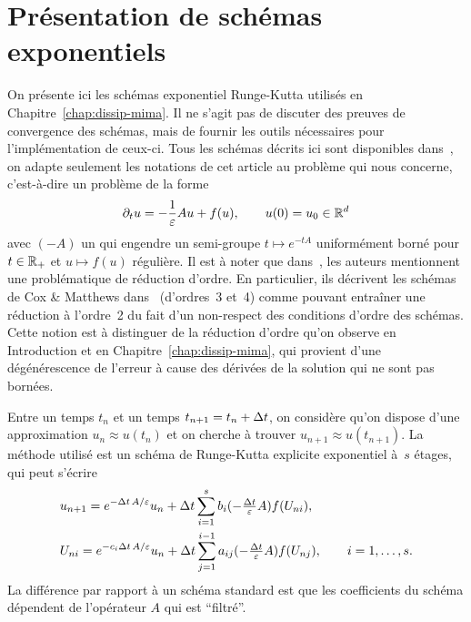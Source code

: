 
\chapter{Présentation de schémas exponentiels}
\label{chap:schemas}

On présente ici les schémas exponentiel Runge-Kutta utilisés en Chapitre~\ref{chap:dissip-mima}. Il ne s'agit pas de discuter des preuves de convergence des schémas, mais de fournir les outils nécessaires pour l'implémentation de ceux-ci. Tous les schémas décrits ici sont disponibles dans~\cite{hochbruck.2005.explicit}, on adapte seulement les notations de cet article au problème qui nous concerne, c'est-à-dire un problème de la forme
\begin{equation*}
    \partial_t u = -\frac{1}{\varepsilon} A u + f(u), 
    \qquad 
    u(0) = u_0 \in \mathbb{R}^d
\end{equation*}
avec $(-A)$ un qui engendre un semi-groupe $t \mapsto e^{-tA}$ uniformément borné pour $t \in \mathbb{R}_+$ et $u \mapsto f(u)$ régulière. Il est à noter que dans~\cite{hochbruck.2005.explicit}, les auteurs mentionnent une problématique de réduction d'ordre. En particulier, ils décrivent les schémas de Cox \& Matthews dans~\cite{cox.2002.exponential} (d'ordres~3 et~4) comme pouvant entraîner une réduction à l'ordre~2 du fait d'un non-respect des conditions d'ordre des schémas. Cette notion est à distinguer de la réduction d'ordre qu'on observe en Introduction et en Chapitre~\ref{chap:dissip-mima}, qui provient d'une dégénérescence de l'erreur à cause des dérivées de la solution qui ne sont pas bornées.


Entre un temps $t_n$ et un temps $t_{n+1} = t_n + \Delta t$, on considère qu'on dispose d'une approximation $u_n \approx u(t_n)$ et on cherche à trouver $u_{n+1} \approx u(t_{n+1})$. La méthode utilisé est un schéma de Runge-Kutta explicite exponentiel à~$s$ étages, qui peut s'écrire
\begin{align*}
& u_{n+1} = e^{-\Delta t\, A/\varepsilon} u_n + \Delta t \sum_{i = 1}^s 
    b_i({\textstyle -\frac{\Delta t}{\varepsilon} A}) f(U_{ni}) ,
\\
& U_{ni} = e^{-c_i \Delta t\, A/\varepsilon} u_n + \Delta t \sum_{j = 1}^{i-1} 
    a_{ij}({\textstyle -\frac{\Delta t}{\varepsilon} A}) f(U_{nj}),
\qquad
  i = 1, \ldots, s .
\end{align*}
La différence par rapport à un schéma standard est que les coefficients du schéma dépendent de l'opérateur $A$ qui est \enquote{filtré}. 

